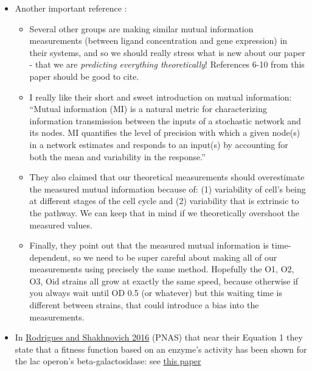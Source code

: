 \begin{itemize}
	\item Another important reference \cite{Chevalier2015}:
		\begin{itemize}
			\item Several other groups are making similar mutual information measurements (between ligand concentration and gene expression) in their systems, and so we should really stress what is new about our paper - that we are \textit{predicting everything theoretically}! References 6-10 from this paper should be good to cite.
			\item I really like their short and sweet introduction on mutual information: ``Mutual information (MI) is a natural metric for characterizing information transmission between the inputs of a stochastic network and its nodes. MI quantifies the level of precision with which a given node(s) in a network estimates and responds to an input(s) by accounting for both the mean and variability in the response.''
			\item They also claimed that our theoretical measurements should overestimate the measured mutual information because of: (1) variability of cell's being at different stages of the cell cycle and (2) variability that is extrinsic to the pathway. We can keep that in mind if we theoretically overshoot the measured values.
			\item Finally, they point out that the measured mutual information is time-dependent, so we need to be super careful about making all of our measurements using precisely the same method. Hopefully the O1, O2, O3, Oid strains all grow at exactly the same speed, because otherwise if you always wait until OD 0.5 (or whatever) but this waiting time is different between strains, that could introduce a bias into the measurements.
		\end{itemize}
	
	\item In \href{http://www.pnas.org/content/113/11/E1470.full}{Rodrigues and Shakhnovich 2016} (PNAS) that near their Equation 1 they state that a fitness function based on an enzyme's activity has been shown for the lac operon's beta-galactosidase: see \href{http://www.genetics.org/content/genetics/115/1/25.full.pdf}{this paper}
	

\end{itemize}
